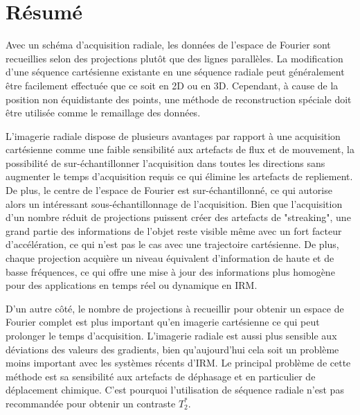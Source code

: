 \section{Résumé}

Avec un schéma d'acquisition radiale, les données de l'espace de Fourier sont recueillies selon des projections plutôt que des lignes parallèles. La modification d'une séquence cartésienne existante en une séquence radiale peut généralement être facilement effectuée que ce soit en 2D ou en 3D. Cependant, à cause de la position non équidistante des points, une méthode de reconstruction spéciale doit être utilisée comme le remaillage des données.

L'imagerie radiale dispose de plusieurs avantages par rapport à une acquisition cartésienne comme une faible sensibilité aux artefacts de flux et de mouvement, la possibilité de sur-échantillonner l'acquisition dans toutes les directions sans augmenter le temps d'acquisition requis ce qui élimine les artefacts de repliement. De plus, le centre de l'espace de Fourier est sur-échantillonné, ce qui autorise alors un intéressant sous-échantillonnage de l'acquisition. Bien que l'acquisition d'un nombre réduit de projections puissent créer des artefacts de "streaking", une grand partie des informations de l'objet reste visible même avec un fort facteur d'accélération, ce qui n'est pas le cas avec une trajectoire cartésienne. De plus, chaque projection acquière un niveau équivalent d'information de haute et de basse fréquences, ce qui offre une mise à jour des informations plus homogène pour des applications en temps réel ou dynamique en IRM.

D'un autre côté, le nombre de projections à recueillir pour obtenir un espace de Fourier complet est plus important qu'en imagerie cartésienne ce qui peut prolonger le temps d'acquisition. L'imagerie radiale est aussi plus sensible aux déviations des valeurs des gradients, bien qu'aujourd'hui cela soit un problème moins important avec les systèmes récents d'IRM. Le principal problème de cette méthode est sa sensibilité aux artefacts de déphasage et en particulier de déplacement chimique. C'est pourquoi l'utilisation de séquence radiale n'est pas recommandée pour obtenir un contraste $T_2^*$.

